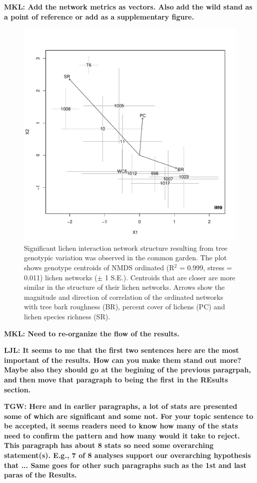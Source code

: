 \documentclass[9pt,twocolumn,twoside,lineno]{pnas-new}
\begin{document}
{\textbf{MKL: Add the network metrics as vectors. Also add the wild
  stand as a point of reference or add as a supplementary figure.}

\begin{figure}[ht]
\centering
\includegraphics[width=\linewidth]{cn_chplot.pdf}
\caption{Significant lichen interaction network structure resulting
  from tree genotypic variation was observed in the common garden.
  The plot shows genotype centroids of NMDS ordinated (R$^2$ = 0.999,
  stress = 0.011) lichen networks ($\pm$ 1 S.E.). Centroids that are
  closer are more similar in the structure of their lichen
  networks. Arrows show the magnitude and direction of correlation of
  the ordinated networks with tree bark roughness (BR), percent cover
  of lichens (PC) and lichen species richness (SR).}
\label{fig:cn_ch_plot}
\end{figure}

\textbf{MKL: Need to re-organize the flow of the results.}


\textbf{LJL: It seems to me that the first two sentences here are the
  most important of the results. How can you make them stand out more?
  Maybe also they should go at the begining of the previous paragrpah,
  and then move that paragraph to being the first in the REsults
  section.}

\textbf{TGW: Here and in earlier paragraphs, a lot of stats are
  presented some of which are significant and some not.  For your
  topic sentence to be accepted, it seems readers need to know how
  many of the stats need to confirm the pattern and how many would it
  take to reject.  This paragraph has about 8 stats so need some
  overarching statement(s).  E.g., 7 of 8 analyses support our
  overarching hypothesis that ...  Same goes for other such paragraphs
  such as the 1st and last paras of the Results.}

}
\end{document}
